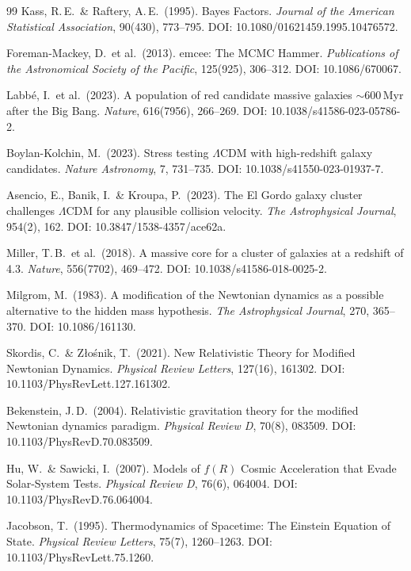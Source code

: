 \documentclass[aps,prd,twocolumn,superscriptaddress,nofootinbib]{revtex4-2}
\begin{document}
\begin{thebibliography}{99}
Kass, R.\,E.\ \& Raftery, A.\,E.\ (1995).
Bayes Factors.
\textit{Journal of the American Statistical Association}, 90(430), 773--795.
DOI: 10.1080/01621459.1995.10476572.

Foreman-Mackey, D.\ et al.\ (2013).
emcee: The MCMC Hammer.
\textit{Publications of the Astronomical Society of the Pacific}, 125(925), 306--312.
DOI: 10.1086/670067.

Labb\'e, I.\ et al.\ (2023).
A population of red candidate massive galaxies $\sim$600\,Myr after the Big Bang.
\textit{Nature}, 616(7956), 266--269.
DOI: 10.1038/s41586-023-05786-2.

Boylan-Kolchin, M.\ (2023).
Stress testing $\Lambda$CDM with high-redshift galaxy candidates.
\textit{Nature Astronomy}, 7, 731--735.
DOI: 10.1038/s41550-023-01937-7.

Asencio, E., Banik, I.\ \& Kroupa, P.\ (2023).
The El Gordo galaxy cluster challenges $\Lambda$CDM for any plausible collision velocity.
\textit{The Astrophysical Journal}, 954(2), 162.
DOI: 10.3847/1538-4357/ace62a.

Miller, T.\,B.\ et al.\ (2018).
A massive core for a cluster of galaxies at a redshift of 4.3.
\textit{Nature}, 556(7702), 469--472.
DOI: 10.1038/s41586-018-0025-2.

Milgrom, M.\ (1983).
A modification of the Newtonian dynamics as a possible alternative to the hidden mass hypothesis.
\textit{The Astrophysical Journal}, 270, 365--370.
DOI: 10.1086/161130.

Skordis, C.\ \& Z{\l}o\'snik, T.\ (2021).
New Relativistic Theory for Modified Newtonian Dynamics.
\textit{Physical Review Letters}, 127(16), 161302.
DOI: 10.1103/PhysRevLett.127.161302.

Bekenstein, J.\,D.\ (2004).
Relativistic gravitation theory for the modified Newtonian dynamics paradigm.
\textit{Physical Review D}, 70(8), 083509.
DOI: 10.1103/PhysRevD.70.083509.

Hu, W.\ \& Sawicki, I.\ (2007).
Models of $f(R)$ Cosmic Acceleration that Evade Solar-System Tests.
\textit{Physical Review D}, 76(6), 064004.
DOI: 10.1103/PhysRevD.76.064004.

Jacobson, T.\ (1995).
Thermodynamics of Spacetime: The Einstein Equation of State.
\textit{Physical Review Letters}, 75(7), 1260--1263.
DOI: 10.1103/PhysRevLett.75.1260.


\end{thebibliography}
\end{document}
